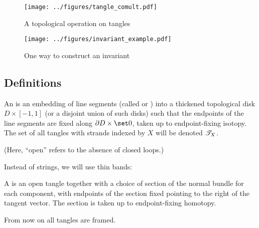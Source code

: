 \documentclass{beamer}
\theoremstyle{theorem}
\begin{document}
\begin{frame}
\begin{figure}
        \centering
        \texttt{[image: ../figures/tangle\_comult.pdf]}
        \caption{A topological operation on tangles}
        \label{fig:tangle_comult_example}
\end{figure}
\end{frame}

\begin{frame}
        \begin{figure}
                \centering
                \texttt{[image: ../figures/invariant\_example.pdf]}
                \caption{One way to construct an invariant}
                \label{fig:invariant_example}
        \end{figure}
\end{frame}

\subsection{Definitions}

\begin{frame}
        \begin{definition}
                An  is an embedding of line segments (called
                 or ) into a thickened
                topological disk $D \times [-1,1]$ (or a disjoint union of such
                disks) such that the endpoints of the line segments are fixed
                along $\boundary D \times \set0$, taken up to endpoint-fixing
                isotopy.
                \pause
                The set of all tangles with strands indexed by $X$ will be
                denoted $\mathscr{T}_{X}$.
        \end{definition}
        \pause
        (Here, \enquote{open} refers to the absence of closed loops.)
\end{frame}

\begin{frame}
        Instead of strings, we will use thin bands:
        \pause
        \begin{definition}
                A  is an open tangle together with a choice
                of section of the normal bundle for each component, with
                endpoints of the section fixed pointing to the right of the
                tangent vector. The section is taken up to endpoint-fixing
                homotopy.
        \end{definition}
        \pause
        From now on all tangles are framed.
\end{frame}
\end{document}
